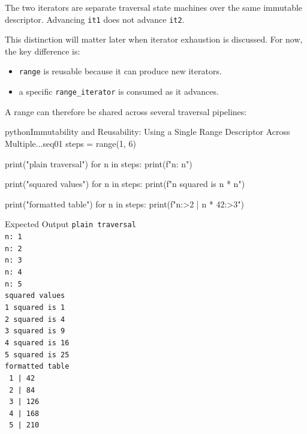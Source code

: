 \documentclass[a4paper,twoside]{report}
\begin{document}
The two iterators are separate traversal state machines over the same immutable descriptor. Advancing \texttt{it1} does not advance \texttt{it2}.

This distinction will matter later when iterator exhaustion is discussed. For now, the key difference is:

\begin{itemize}
    \item \texttt{range} is reusable because it can produce new iterators.
    \item a specific \texttt{range\_iterator} is consumed as it advances.
\end{itemize}

A range can therefore be shared across several traversal pipelines:

\begin{codebox}[]{python}{Immutability and Reusability: Using a Single Range Descriptor Across Multiple...}{seq01}
steps = range(1, 6)

print("plain traversal")
for n in steps:
    print(f"n: {n}")

print("squared values")
for n in steps:
    print(f"{n} squared is {n * n}")

print("formatted table")
for n in steps:
    print(f"{n:>2} | {n * 42:>3}")
\end{codebox}


\begin{iobox}{Expected Output}
\texttt{plain traversal} \\
\texttt{n: 1} \\
\texttt{n: 2} \\
\texttt{n: 3} \\
\texttt{n: 4} \\
\texttt{n: 5} \\
\texttt{squared values} \\
\texttt{1 squared is 1} \\
\texttt{2 squared is 4} \\
\texttt{3 squared is 9} \\
\texttt{4 squared is 16} \\
\texttt{5 squared is 25} \\
\texttt{formatted table} \\
\texttt{ 1 |  42} \\
\texttt{ 2 |  84} \\
\texttt{ 3 | 126} \\
\texttt{ 4 | 168} \\
\texttt{ 5 | 210} \\
\end{iobox}
\end{document}
